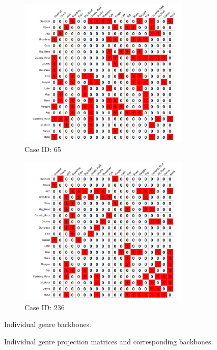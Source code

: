 \documentclass[12pt]{article}
\begin{document}
\begin{figure}[t]
\begin{subfigure}[b]{0.49\textwidth}
            \label{fig:ind-ex-rp2}
    \end{subfigure}
     \begin{subfigure}[b]{0.49\textwidth}
        \includegraphics[trim={1cm 0cm 0cm 0cm},clip, width=0.9\textwidth]{Plots/data-ex-rbb1.png}
            \caption{Case ID: 65}
            \label{fig:ind-ex-rbb1}
    \end{subfigure}
     \begin{subfigure}[b]{0.49\textwidth}
        \includegraphics[trim={1cm 0cm 0cm 0cm},clip, width=0.9\textwidth]{Plots/data-ex-rbb2.png}
            \caption{Case ID: 236}
            \label{fig:ind-ex-rbb2}
    \end{subfigure}
    \caption{Individual genre backbones.}
    \caption{Individual genre projection matrices and corresponding backbones.}
    \label{fig:ind-ex-rp}
\end{figure}
\end{document}
